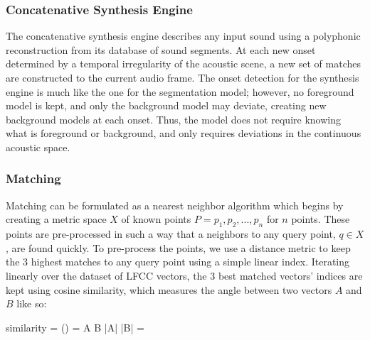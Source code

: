 \documentclass[a4paper,10pt,final]{ThesisStyle}
\begin{document}

\subsubsection{Concatenative Synthesis Engine}

The concatenative synthesis engine describes any input sound using a polyphonic reconstruction from its database of sound segments.  At each new onset determined by a temporal irregularity of the acoustic scene, a new set of matches are constructed to the current audio frame.  The onset detection for the synthesis engine is much like the one for the segmentation model; however, no foreground model is kept, and only the background model may deviate, creating new background models at each onset.  Thus, the model does not require knowing what is foreground or background, and only requires deviations in the continuous acoustic space.  


\subsubsection{Matching}

Matching can be formulated as a nearest neighbor algorithm which begins by creating a metric space $X$ of known points $P = p_1, p_2, ..., p_n$ for $n$ points.  These points are pre-processed in such a way that a neighbors to any query point, $q \in X$, are found quickly.  To pre-process the points, we use a distance metric to keep the 3 highest matches to any query point using a simple linear index.  Iterating linearly over the dataset of LFCC vectors, the 3 best matched vectors' indices are kept using cosine similarity, which measures the angle between two vectors $A$ and $B$ like so:

\begin{equationb}
\textnormal{similarity} = \cos(\theta) = {A \cdot B \over |A| |B|} =  
\end{equationb}
\end{document}

